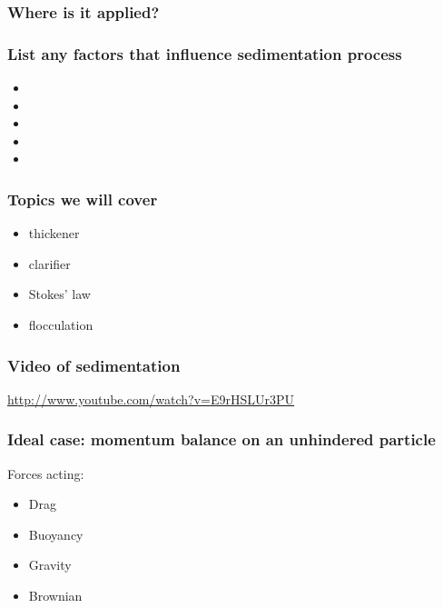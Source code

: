 \begin{frame}\frametitle{Where is it applied?}
	
\end{frame}

\begin{frame}\frametitle{List any factors that influence sedimentation process}
	\begin{itemize}
		\item	\iftoggle{instructor}{viscosity of fluid}{}
		\item	\iftoggle{instructor}{particle concentration (hindered)}{}
		\item	\iftoggle{instructor}{diameter of the vessel: NO}{}
		\item	\iftoggle{instructor}{mass of particle: NO}{}
		\item	\iftoggle{instructor}{diameter of the vessel: NO}{}
	\end{itemize}
\end{frame}

\begin{frame}\frametitle{Topics we will cover}
	\begin{itemize}
		\item	thickener
		\item	clarifier
		\item	Stokes' law
		\item	flocculation		
	\end{itemize}
\end{frame}

\begin{frame}\frametitle{Video of sedimentation}
	\href{http://www.youtube.com/watch?v=E9rHSLUr3PU}{http://www.youtube.com/watch?v=E9rHSLUr3PU}
\end{frame}

\begin{frame}\frametitle{Ideal case: momentum balance on an unhindered particle}
	
	Forces acting:
	\begin{itemize}
		\item	Drag
		\item	Buoyancy
		\item	Gravity	
		\item	Brownian 
	\end{itemize}
\end{frame}

